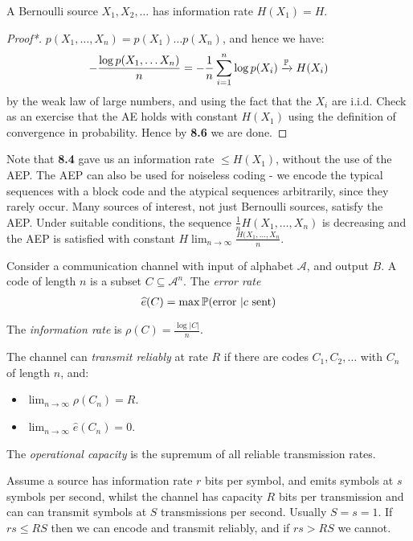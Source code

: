 \documentclass[10pt,a4paper]{article}
\begin{document}
\begin{corollary}
A Bernoulli source $X_1, X_2, \ldots$ has information rate $H(X_1) = H$.
\end{corollary}
\begin{proof}[Proof*]
$p(X_1, \ldots, X_n) = p(X_1)\ldots p(X_n)$, and hence we have:
\begin{align*}
-\frac{\log p(X_1, \ldots X_n)}{n} = -\frac{1}{n}\sum_{i=1}^n \log p(X_i) \xrightarrow{\P} H(X_i)
\end{align*}
by the weak law of large numbers, and using the fact that the $X_i$ are i.i.d. Check as an exercise that the AE holds with constant $H(X_1)$ using the definition of convergence in probability. Hence by \textbf{8.6} we are done.
\end{proof}
Note that \textbf{8.4} gave us an information rate $\leq H(X_1)$, without the use of the AEP. The AEP can also be used for noiseless coding - we encode the typical sequences with a block code and the atypical sequences arbitrarily, since they rarely occur. Many sources of interest, not just Bernoulli sources, satisfy the AEP. Under suitable conditions, the sequence $\frac1n H(X_1, \ldots, X_n)$ is decreasing and the AEP is satisfied with constant $H \lim_{n\to \infty} \frac{H(X_1,\ldots, X_n}{n}$.

Consider a communication channel with input of alphabet $\mathscr{A}$, and output $B$. A code of length $n$ is a subset $C \subseteq \mathscr{A}^n$. The \emph{error rate}
\begin{align*}
\hat{e}(C) = \max \P(\text{error }|c\text{ sent})
\end{align*}

The \emph{information rate} is $\rho(C) = \frac{\log |C|}{n}$.

The channel can \emph{transmit reliably} at rate $R$ if there are codes $C_1, C_2, \ldots$ with $C_n$ of length $n$, and:
\begin{itemize}
\item $\lim_{n \to \infty} \rho(C_n) = R$.
\item $\lim_{n \to \infty} \hat{e}(C_n) = 0$.
\end{itemize}
The \emph{operational capacity} is the supremum of all reliable transmission rates.

Assume a source has information rate $r$ bits per symbol, and emits symbols at $s$ symbols per second, whilst the channel has capacity $R$ bits per transmission and can can transmit symbols at $S$ transmissions per second. Usually $S=s=1$. If $rs \leq RS$ then we can encode and transmit reliably, and if $rs > RS$ we cannot.
\end{document}
